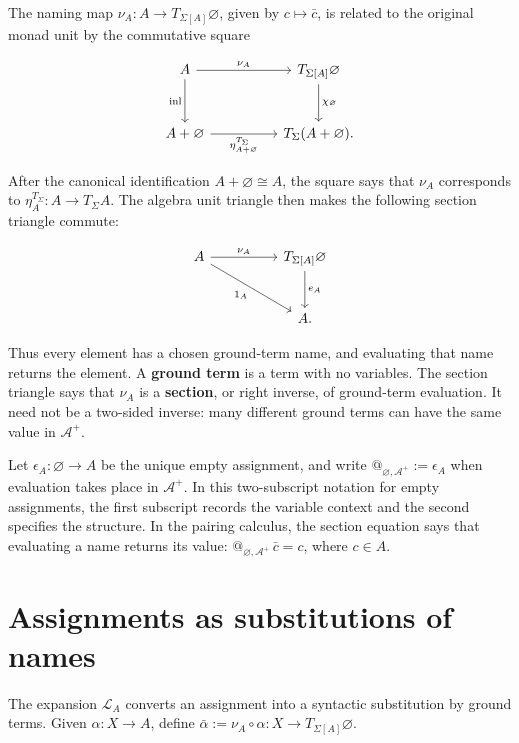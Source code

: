 \documentclass[11pt]{article}
\makeatletter
\newcommand{\atsign}{\mathord{@}}
\makeatother
\begin{document}
The naming map \(\nu_A:A\to T_{\Sigma[A]}\varnothing\), given by
\(c\mapsto\bar c\), is related to the original monad unit by the commutative
square

\[
\begin{tikzcd}[row sep=large,column sep=huge]
A \arrow[r,"\nu_A"] \arrow[d,"\operatorname{inl}"'] &
T_{\Sigma[A]}\varnothing \arrow[d,"\chi_\varnothing"] \\
A+\varnothing \arrow[r,"\eta^{T_\Sigma}_{A+\varnothing}"'] &
T_\Sigma(A+\varnothing).
\end{tikzcd}
\]

After the canonical identification \(A+\varnothing\cong A\), the square says
that \(\nu_A\) corresponds to \(\eta_A^{T_\Sigma}:A\to T_\Sigma A\). The
algebra unit triangle then makes the following section triangle commute:

\[
\begin{tikzcd}[row sep=large,column sep=huge]
A \arrow[r,"\nu_A"] \arrow[dr,"1_A"'] &
T_{\Sigma[A]}\varnothing \arrow[d,"e_A"] \\
& A.
\end{tikzcd}
\]

Thus every element has a chosen ground-term name, and evaluating that
name returns the element. A \textbf{ground term} is a term with no
variables. The section triangle says that \(\nu_A\) is a
\textbf{section}, or right inverse, of ground-term evaluation. It need
not be a two-sided inverse: many different ground terms can have the
same value in \(\mathcal A^+\).

Let \(\epsilon_A:\varnothing\to A\) be the unique empty assignment, and
write \(\atsign_{\varnothing,\mathcal A^+}:=\epsilon_A\) when evaluation
takes place in \(\mathcal A^+\). In this two-subscript notation for empty
assignments, the first subscript records the variable context and the second
specifies the structure. In the pairing calculus, the section equation says that
evaluating a name returns its value:
\(\atsign_{\varnothing,\mathcal A^+}\,\bar c=c\), where \(c\in A\).

\section{Assignments as substitutions of
names}\label{assignments-as-substitutions-of-names}

The expansion \(\mathcal L_A\) converts an assignment into a syntactic
substitution by ground terms. Given \(\alpha:X\to A\), define
\(\bar\alpha:=\nu_A\circ\alpha:X\to T_{\Sigma[A]}\varnothing\).
\end{document}
